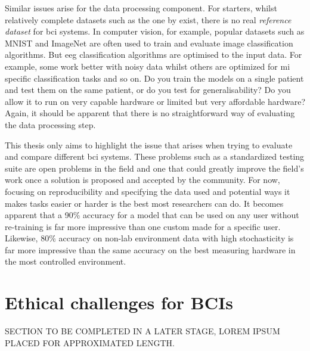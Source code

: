 Similar issues arise for the data processing component.
For starters, whilst relatively complete datasets such as the one by \citet{eeg_data} exist, there is no real \textit{reference dataset} for \gls{bci} systems.
In computer vision, for example, popular datasets such as MNIST \citep{mnist} and ImageNet \citep{imagenet} are often used to train and evaluate image classification algorithms.
But \gls{eeg} classification algorithms are optimised to the input data.
For example, some work better with noisy data whilst others are optimized for \gls{mi} specific classification tasks and so on.
Do you train the models on a single patient and test them on the same patient, or do you test for generalisability?
Do you allow it to run on very capable hardware or limited but very affordable hardware?
Again, it should be apparent that there is no straightforward way of evaluating the data processing step. 

This thesis only aims to highlight the issue that arises when trying to evaluate and compare different \gls{bci} systems.
These problems such as a standardized testing suite are open problems in the field and one that could greatly improve the field's work once a solution is proposed and accepted by the community.
For now, focusing on reproducibility and specifying the data used and potential ways it makes tasks easier or harder is the best most researchers can do.
It becomes apparent that a 90\% accuracy for a model that can be used on any user without re-training is far more impressive than one custom made for a specific user.
Likewise, 80\% accuracy on non-lab environment data with high stochasticity is far more impressive than the same accuracy on the best measuring hardware in the most controlled environment. 


\section{Ethical challenges for BCIs}
\label{sec:bci_ethical}


SECTION TO BE COMPLETED IN A LATER STAGE, LOREM IPSUM PLACED FOR APPROXIMATED LENGTH.

\lipsum[1-2]


